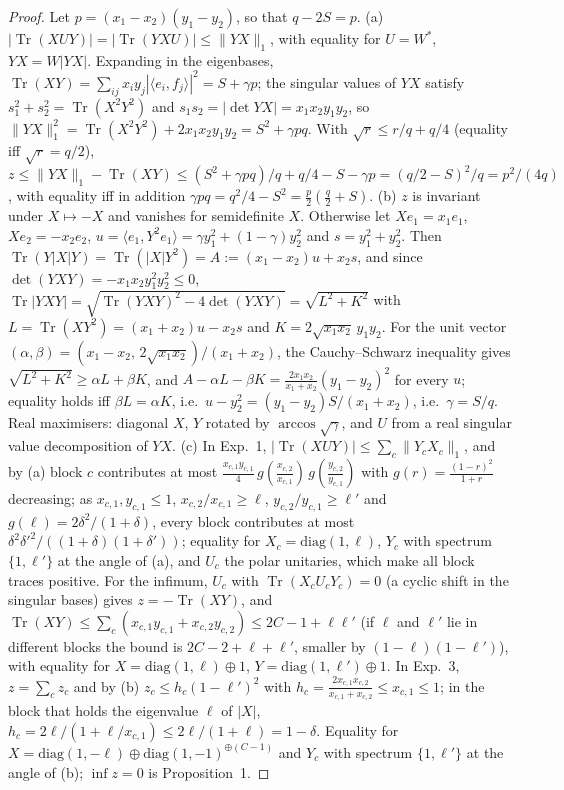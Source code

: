 \documentclass[11pt]{article}
\DeclareMathOperator{\Tr}{Tr}
\begin{document}
\begin{proof}
Let $p=(x_1-x_2)(y_1-y_2)$, so that $q-2S=p$. (a) $|\Tr(XUY)|=|\Tr(YXU)|\le\|YX\|_1$, with equality for $U=W^*$,
$YX=W|YX|$. Expanding in the eigenbases, $\Tr(XY)=\sum_{ij}x_iy_j|\langle e_i,f_j\rangle|^2=S+\gamma p$; the singular values of
$YX$ satisfy $s_1^2+s_2^2=\Tr(X^2Y^2)$ and $s_1s_2=|\det YX|=x_1x_2y_1y_2$, so $\|YX\|_1^2=\Tr(X^2Y^2)+2x_1x_2y_1y_2=S^2+\gamma pq$.
With $\sqrt r\le r/q+q/4$ (equality iff $\sqrt r=q/2$),
$z\le\|YX\|_1-\Tr(XY)\le(S^2+\gamma pq)/q+q/4-S-\gamma p=(q/2-S)^2/q=p^2/(4q)$, with equality iff in addition
$\gamma pq=q^2/4-S^2=\frac p2(\frac q2+S)$.
(b) $z$ is invariant under $X\mapsto-X$ and vanishes for semidefinite $X$. Otherwise let $Xe_1=x_1e_1$, $Xe_2=-x_2e_2$,
$u=\langle e_1,Y^2e_1\rangle=\gamma y_1^2+(1-\gamma)y_2^2$ and $s=y_1^2+y_2^2$. Then $\Tr(Y|X|Y)=\Tr(|X|Y^2)=A:=(x_1-x_2)u+x_2s$, and
since $\det(YXY)=-x_1x_2y_1^2y_2^2\le0$, $\Tr|YXY|=\sqrt{\Tr(YXY)^2-4\det(YXY)}=\sqrt{L^2+K^2}$ with $L=\Tr(XY^2)=(x_1+x_2)u-x_2s$
and $K=2\sqrt{x_1x_2}\,y_1y_2$. For the unit vector $(\alpha,\beta)=(x_1-x_2,\,2\sqrt{x_1x_2})/(x_1+x_2)$, the Cauchy--Schwarz
inequality gives $\sqrt{L^2+K^2}\ge\alpha L+\beta K$, and $A-\alpha L-\beta K=\frac{2x_1x_2}{x_1+x_2}(y_1-y_2)^2$ for every $u$;
equality holds iff $\beta L=\alpha K$, i.e.\ $u-y_2^2=(y_1-y_2)S/(x_1+x_2)$, i.e.\ $\gamma=S/q$. Real maximisers: diagonal $X$, $Y$ rotated by
$\arccos\sqrt\gamma$, and $U$ from a real singular value decomposition of $YX$.
(c) In Exp.~1, $|\Tr(XUY)|\le\sum_c\|Y_cX_c\|_1$, and by (a) block $c$ contributes at most
$\frac{x_{c,1}y_{c,1}}4\,g(\frac{x_{c,2}}{x_{c,1}})\,g(\frac{y_{c,2}}{y_{c,1}})$ with $g(r)=\frac{(1-r)^2}{1+r}$ decreasing; as
$x_{c,1},y_{c,1}\le1$, $x_{c,2}/x_{c,1}\ge\ell$, $y_{c,2}/y_{c,1}\ge\ell'$ and $g(\ell)=2\delta^2/(1+\delta)$, every block contributes at
most $\delta^2\delta'^2/((1+\delta)(1+\delta'))$; equality for $X_c=\mathrm{diag}(1,\ell)$, $Y_c$ with spectrum $\{1,\ell'\}$ at the angle
of (a), and $U_c$ the polar unitaries, which make all block traces positive. For the infimum, $U_c$ with
$\Tr(X_cU_cY_c)=0$ (a cyclic shift in the singular bases) gives $z=-\Tr(XY)$, and $\Tr(XY)\le\sum_c(x_{c,1}y_{c,1}+x_{c,2}y_{c,2})\le
2C-1+\ell\ell'$ (if $\ell$ and $\ell'$ lie in different blocks the bound is $2C-2+\ell+\ell'$, smaller by $(1-\ell)(1-\ell')$), with
equality for $X=\mathrm{diag}(1,\ell)\oplus1$, $Y=\mathrm{diag}(1,\ell')\oplus1$. In Exp.~3, $z=\sum_cz_c$ and by (b)
$z_c\le h_c(1-\ell')^2$ with $h_c=\frac{2x_{c,1}x_{c,2}}{x_{c,1}+x_{c,2}}\le x_{c,1}\le1$; in the block that holds the eigenvalue $\ell$
of $|X|$, $h_c=2\ell/(1+\ell/x_{c,1})\le2\ell/(1+\ell)=1-\delta$. Equality for $X=\mathrm{diag}(1,-\ell)\oplus\mathrm{diag}(1,-1)^{\oplus(C-1)}$
and $Y_c$ with spectrum $\{1,\ell'\}$ at the angle of (b); $\inf z=0$ is Proposition~1.
\end{proof}
\end{document}
